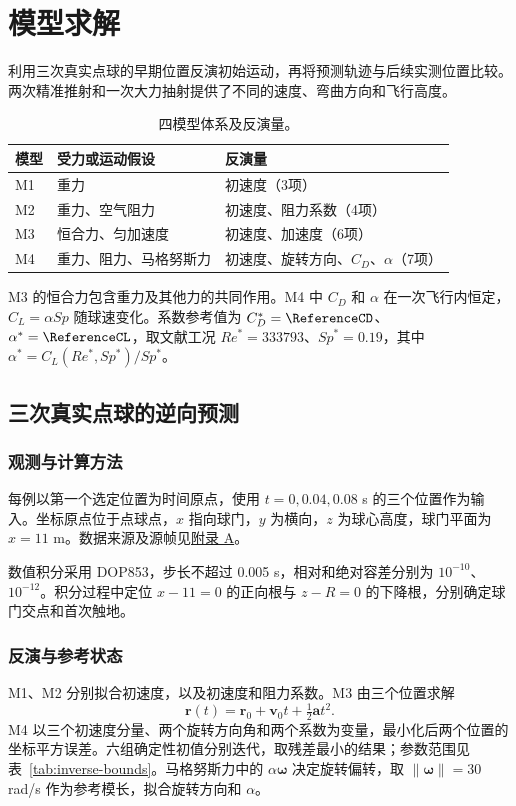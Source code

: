 \section{模型求解}\label{sec:solving}
利用三次真实点球的早期位置反演初始运动，再将预测轨迹与后续实测位置比较。两次精准推射和一次大力抽射提供了不同的速度、弯曲方向和飞行高度。
\begin{table}[H]\centering\small\caption{四模型体系及反演量。}\label{tab:models}
\begin{tabular}{lll}\toprule
模型 & 受力或运动假设 & 反演量\\\midrule
M1 & 重力 & 初速度（3项）\\
M2 & 重力、空气阻力 & 初速度、阻力系数（4项）\\
M3 & 恒合力、匀加速度 & 初速度、加速度（6项）\\
M4 & 重力、阻力、马格努斯力 & 初速度、旋转方向、$C_D$、$\alpha$（7项）\\\bottomrule
\end{tabular}\end{table}
M3 的恒合力包含重力及其他力的共同作用。M4 中 $C_D$ 和 $\alpha$ 在一次飞行内恒定，$C_L=\alpha Sp$ 随球速变化。系数参考值为 $C_D^*=\ReferenceCD$、$\alpha^*=\ReferenceCL$，取文献工况 $Re^*=333793$、$Sp^*=0.19$，其中 $\alpha^*=C_L(Re^*,Sp^*)/Sp^*$\cite{kiratidis2018}。

\subsection{三次真实点球的逆向预测}\label{sec:inverse}
\subsubsection{观测与计算方法}
每例以第一个选定位置为时间原点，使用 $t=0,0.04,0.08$ s 的三个位置作为输入。坐标原点位于点球点，$x$ 指向球门，$y$ 为横向，$z$ 为球心高度，球门平面为 $x=11$ m。数据来源及源帧见\hyperref[app:data]{附录 A}。

数值积分采用 DOP853，步长不超过 0.005 s，相对和绝对容差分别为 $10^{-10}$、$10^{-12}$。积分过程中定位 $x-11=0$ 的正向根与 $z-R=0$ 的下降根，分别确定球门交点和首次触地。

\subsubsection{反演与参考状态}
M1、M2 分别拟合初速度，以及初速度和阻力系数。M3 由三个位置求解
\begin{equation}
\boldsymbol r(t)=\boldsymbol r_0+\boldsymbol v_0t+\tfrac12\boldsymbol a t^2.
\label{eq:m3-interpolation}\end{equation}
M4 以三个初速度分量、两个旋转方向角和两个系数为变量，最小化后两个位置的坐标平方误差。六组确定性初值分别迭代，取残差最小的结果；参数范围见表~\ref{tab:inverse-bounds}。马格努斯力中的 $\alpha\boldsymbol\omega$ 决定旋转偏转，取 $\|\boldsymbol\omega\|=30$ rad/s 作为参考模长，拟合旋转方向和 $\alpha$。


